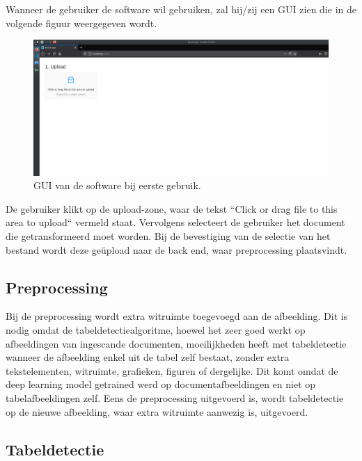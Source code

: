 Wanneer de gebruiker de software wil gebruiken, zal hij/zij een GUI zien die in de volgende figuur weergegeven wordt.

\begin{figure}[H]
    \centering
    \includegraphics[width=1\textwidth]{img/gui_screenshot_not_used.png}
    \caption{GUI van de software bij eerste gebruik.}
    \label{fig:gui-screenshot-not-used}
\end{figure}

De gebruiker klikt op de upload-zone, waar de tekst ``Click or drag file to this area to upload`` vermeld staat. Vervolgens selecteert de gebruiker het document die getransformeerd moet worden. Bij de bevestiging van de selectie van het bestand wordt deze geüpload naar de back end, waar preprocessing plaatsvindt.

\subsection{Preprocessing}
\label{subsec:preprocessing}

Bij de preprocessing wordt extra witruimte toegevoegd aan de afbeelding. Dit is nodig omdat de tabeldetectiealgoritme, hoewel het zeer goed werkt op afbeeldingen van ingescande documenten, moeilijkheden heeft met tabeldetectie wanneer de afbeelding enkel uit de tabel zelf bestaat, zonder extra tekstelementen, witruimte, grafieken, figuren of dergelijke. Dit komt omdat de deep learning model getrained werd op documentafbeeldingen en niet op tabelafbeeldingen zelf. Eens de preprocessing uitgevoerd is, wordt tabeldetectie op de nieuwe afbeelding, waar extra witruimte aanwezig is, uitgevoerd.

\subsection{Tabeldetectie}
\label{subsec:tabel-detectie}

